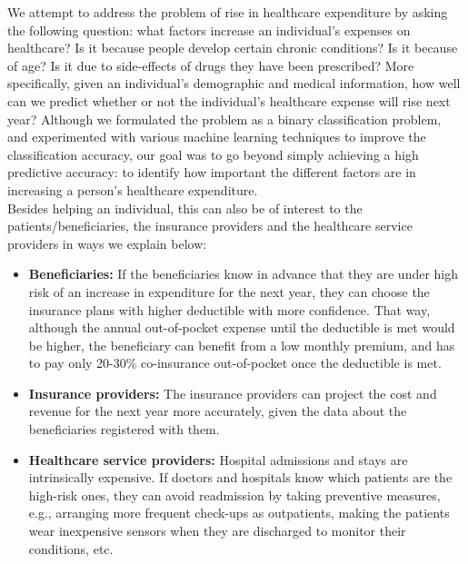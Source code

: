 We attempt to address the problem of rise in healthcare expenditure by asking the following question: what factors increase an individual's expenses on healthcare? Is it because people develop certain chronic conditions? Is it because of age? Is it due to side-effects of drugs they have been prescribed? More specifically, given an individual's demographic and medical information, how well can we predict whether or not the individual's healthcare expense will rise next year? Although we formulated the problem as a binary classification problem, and experimented with various machine learning techniques to improve the classification accuracy, our goal was to go beyond simply achieving a high predictive accuracy: to identify how important the different factors are in increasing a person's healthcare expenditure.\\

Besides helping an individual, this can also be of interest to the patients/beneficiaries, the insurance providers and the healthcare service providers in ways we explain below:
\begin{itemize}
\item {\bf Beneficiaries:} If the beneficiaries know in advance that they are under high risk of an increase in expenditure for the next year, they can choose the insurance plans with higher deductible with more confidence. That way, although the annual out-of-pocket expense until the deductible is met would be higher, the beneficiary can benefit from a low monthly premium, and has to pay only 20-30\% co-insurance out-of-pocket once the deductible is met. 
\item {\bf Insurance providers:} The insurance providers can project the cost and revenue for the next year more accurately, given the data about the beneficiaries registered with them.
\item {\bf Healthcare service providers:} Hospital admissions and stays are intrinsically expensive. If doctors and hospitals know which patients are the high-risk ones, they can avoid readmission by taking preventive measures, e.g., arranging more frequent check-ups as outpatients, making the patients wear inexpensive sensors when they are discharged to monitor their conditions, etc.
\end{itemize}

